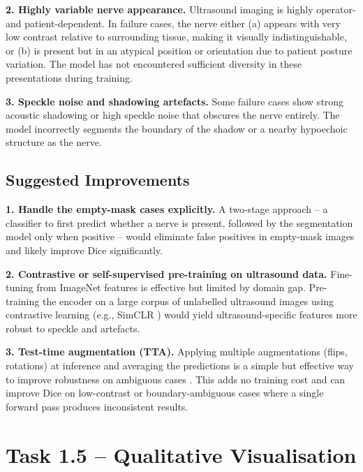 \documentclass[11pt,a4paper]{article}
\begin{document}
\textbf{2. Highly variable nerve appearance.}
Ultrasound imaging is highly operator- and patient-dependent. In failure cases,
the nerve either (a) appears with very low contrast relative to surrounding tissue,
making it visually indistinguishable, or (b) is present but in an atypical position
or orientation due to patient posture variation.
The model has not encountered sufficient diversity in these presentations during training.

\textbf{3. Speckle noise and shadowing artefacts.}
Some failure cases show strong acoustic shadowing or high speckle noise that
obscures the nerve entirely. The model incorrectly segments the boundary of the
shadow or a nearby hypoechoic structure as the nerve.

\subsection{Suggested Improvements}

\textbf{1. Handle the empty-mask cases explicitly.}
A two-stage approach \cite{oktay2018attentionunet} -- a classifier to first predict
whether a nerve is present, followed by the segmentation model only when positive --
would eliminate false positives in empty-mask images and likely improve Dice
significantly.

\textbf{2. Contrastive or self-supervised pre-training on ultrasound data.}
Fine-tuning from ImageNet features is effective but limited by domain gap.
Pre-training the encoder on a large corpus of unlabelled ultrasound images using
contrastive learning (e.g., SimCLR \cite{chen2020simclr}) would yield
ultrasound-specific features more robust to speckle and artefacts.

\textbf{3. Test-time augmentation (TTA).}
Applying multiple augmentations (flips, rotations) at inference and averaging the
predictions is a simple but effective way to improve robustness on ambiguous cases
\cite{wang2019aleatoric}.
This adds no training cost and can improve Dice on low-contrast or boundary-ambiguous
cases where a single forward pass produces inconsistent results.

\section{Task 1.5 -- Qualitative Visualisation}
\end{document}
